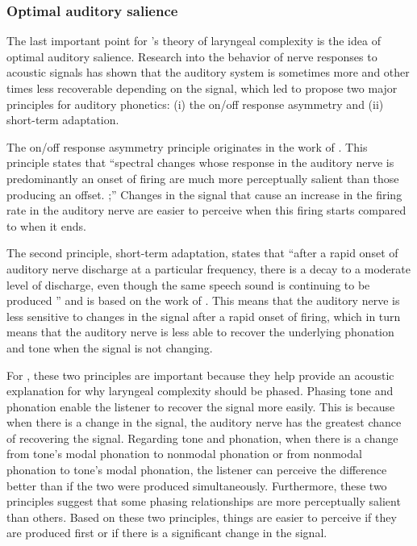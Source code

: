 \subsubsection{Optimal auditory salience}\label{sec:optimal_auditory_salience}

The last important point for \citeauthor{silvermanLaryngealComplexityOtomanguean1997}'s theory of laryngeal complexity is the idea of optimal auditory salience. Research into the behavior of nerve responses to acoustic signals has shown that the auditory system is sometimes more and other times less recoverable depending on the signal, which led \citet{bladonPhoneticsHearers1986} to propose two major principles for auditory phonetics: (i) the on/off response asymmetry and (ii) short-term adaptation.

The on/off response asymmetry principle originates in the work of \citet{tylerPsychoacousticPhoneticTemporal1982}. This principle states that ``spectral changes whose response in the auditory nerve is predominantly an onset of firing are much more perceptually salient than those producing an offset. \citep[249]{silvermanLaryngealComplexityOtomanguean1997};'' Changes in the signal that cause an increase in the firing rate in the auditory nerve are easier to perceive when this firing starts compared to when it ends. 

The second principle, short-term adaptation, states that ``after a rapid onset of auditory nerve discharge at a particular frequency, there is a decay to a moderate level of discharge, even though the same speech sound is continuing to be produced \citep[250]{silvermanLaryngealComplexityOtomanguean1997}'' and is based on the work of \citet{delgutteCorrelatesPhoneticDistinctions1982}. This means that the auditory nerve is less sensitive to changes in the signal after a rapid onset of firing, which in turn means that the auditory nerve is less able to recover the underlying phonation and tone when the signal is not changing.

For \citeauthor{silvermanLaryngealComplexityOtomanguean1997}, these two principles are important because they help provide an acoustic explanation for why laryngeal complexity should be phased. Phasing tone and phonation enable the listener to recover the signal more easily. This is because when there is a change in the signal, the auditory nerve has the greatest chance of recovering the signal. Regarding tone and phonation, when there is a change from tone's modal phonation to nonmodal phonation or from nonmodal phonation to tone's modal phonation, the listener can perceive the difference better than if the two were produced simultaneously. Furthermore, these two principles suggest that some phasing relationships are more perceptually salient than others. Based on these two principles, things are easier to perceive if they are produced first or if there is a significant change in the signal. 

